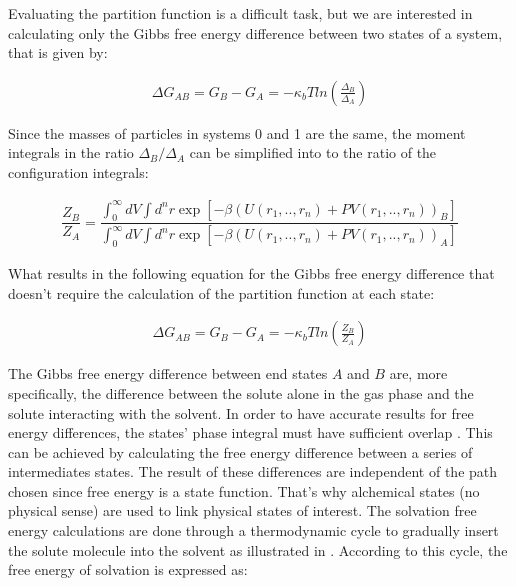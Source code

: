 Evaluating the partition function is a difficult task, but we are interested in calculating only the Gibbs free energy difference between two states of a system, that is given by: 

\begin{equation}
\label{eq:dif}
\begin{aligned}
\Delta G_{AB} = G_{B} - G_{A}= -\kappa_{b}T ln \left( \frac{\Delta_{B}}{\Delta_{A}}\right) 
\end{aligned}
\end{equation}

Since the masses of particles in systems 0 and 1 are the same, the moment integrals in the ratio ${\Delta_{B}}/{\Delta_{A}}$ can be simplified into to the ratio of the configuration integrals:

\begin{equation}
\label{eq:partiso}
\begin{aligned}
\dfrac{Z_{B}}{Z_{A}} = \dfrac{\int_{0}^{\infty} dV \int d^{n}r \exp \left[ -\beta \left(U(r_{1},..,r_{n}) + PV(r_{1},..,r_{n}) \right)_{B} \right]}{\int_{0}^{\infty} dV \int d^{n}r \exp \left[ -\beta \left(U(r_{1},..,r_{n}) + PV(r_{1},..,r_{n}) \right)_{A} \right]}
\end{aligned}
\end{equation}

What results in the following equation for the Gibbs free energy difference that doesn't require the calculation of the partition function at each state:

\begin{equation}
\label{eq:dif}
\begin{aligned}
\Delta G_{AB} = G_{B} - G_{A}= -\kappa_{b}T ln \left( \frac{Z_{B}}{Z_{A}}\right)
\end{aligned}
\end{equation}

The Gibbs free energy difference between end states $A$ and $B$ are, more specifically, the difference between the solute alone in the gas phase and the solute interacting with the solvent. In order to have accurate results for free energy differences, the states' phase integral must have sufficient overlap  \cite{klimovich}. This can be achieved by calculating the free energy difference between a series of intermediates states. The result of these differences are independent of the path chosen since free energy is a state function. That's why alchemical states (no physical sense) are used to link physical states of interest. The solvation free energy calculations are done through a thermodynamic cycle to gradually insert the solute molecule into the solvent as illustrated in . According to this cycle, the free energy of solvation is expressed as:

